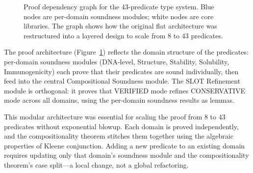 \begin{figure}[t]
\centering
{}
\caption{Proof dependency graph for the 43-predicate type system.
         Blue nodes are per-domain soundness modules; white nodes are
         core libraries. The graph shows how the original flat
         architecture was restructured into a layered design to
         scale from 8 to 43 predicates.}
\label{fig:proofdep}
\end{figure}

The proof architecture (Figure~\ref{fig:proofdep}) reflects the
domain structure of the predicates: per-domain soundness modules
(DNA-level, Structure, Stability, Solubility, Immunogenicity) each
prove that their predicates are sound individually, then feed into
the central Compositional Soundness module.
The SLOT Refinement module is orthogonal: it proves that VERIFIED
mode refines CONSERVATIVE mode across all domains, using the
per-domain soundness results as lemmas.

This modular architecture was essential for scaling the proof from 8
to 43 predicates without exponential blowup.
Each domain is proved independently, and the compositionality theorem
stitches them together using the algebraic properties of Kleene
conjunction.
Adding a new predicate to an existing domain requires updating only
that domain's soundness module and the compositionality theorem's
case split---a local change, not a global refactoring.
